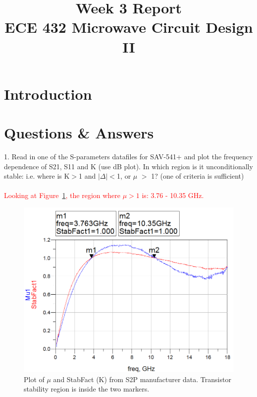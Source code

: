 \documentclass[conference]{IEEEtran}
\begin{document}
\title{Week 3 Report\\ECE 432 Microwave Circuit Design II}
\author{
\and
{}
}
\maketitle
\IEEEpeerreviewmaketitle
\section{Introduction}

\section{Questions \& Answers}
1. Read in one of the S-parameters datafiles for SAV-541+ and plot the frequency dependence of S21, S11 and K (use dB plot). In which region is it unconditionally stable: i.e. where is K$>$1 and $|\Delta|<$1, or $\mu$ $>$ 1? (one of criteria is sufficient)\\\\
\textcolor{red}{Looking at Figure~\ref{fig:stable}, the region where $\mu>1$ is: 3.76 - 10.35 GHz.}

\begin{figure}[!h]
\centering
\includegraphics[scale=0.35]{pic/1stable.png}
\caption{Plot of $\mu$ and StabFact (K) from S2P manufacturer data.  Transistor stability region is inside the two markers.}
\label{fig:stable}
\end{figure}
\end{document}
